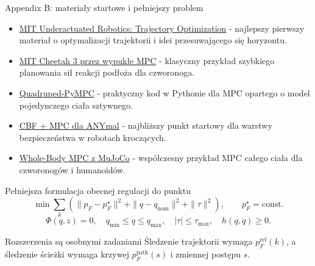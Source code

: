 \begin{frame}{Appendix B: materiały startowe i pełniejszy problem}
\small
\begin{itemize}
  \item \href{https://underactuated.mit.edu/trajopt.html}{MIT Underactuated Robotics: Trajectory Optimization} - najlepszy pierwszy materiał o optymalizacji trajektorii i idei przesuwającego się horyzontu.
  \item \href{https://ieeexplore.ieee.org/document/8594448}{MIT Cheetah 3 przez wypukłe MPC} - klasyczny przykład szybkiego planowania sił reakcji podłoża dla czworonoga.
  \item \href{https://github.com/iit-DLSLab/Quadruped-PyMPC}{Quadruped-PyMPC} - praktyczny kod w Pythonie dla MPC opartego o model pojedynczego ciała sztywnego.
  \item \href{https://arxiv.org/abs/2011.00032}{CBF + MPC dla ANYmal} - najbliższy punkt startowy dla warstwy bezpieczeństwa w robotach kroczących.
  \item \href{https://arxiv.org/abs/2503.04613}{Whole-Body MPC z MuJoCo} - współczesny przykład MPC całego ciała dla czworonogów i humanoidów.
\end{itemize}
\vspace{-0.25em}
\begin{block}{Pełniejsza formulacja obecnej regulacji do punktu}
\[
\min \sum_k \left(
\|p_F-p_F^\star\|^2 + \|q-q_{\mathrm{nom}}\|^2 + \|\tau\|^2\right),
\qquad p_F^\star=\mathrm{const}.
\]
\[
\Phi(q,z)=0,\quad q_{\min}\le q\le q_{\max},\quad |\tau|\le\tau_{\max},\quad h(q,\dot q)\ge0.
\]
\end{block}
\begin{alertblock}{Rozszerzenia są osobnymi zadaniami}
Śledzenie trajektorii wymaga $p_F^{\mathrm{ref}}(k)$, a śledzenie ścieżki wymaga krzywej $p_F^{\mathrm{path}}(s)$ i zmiennej postępu $s$.
\end{alertblock}
\end{frame}
